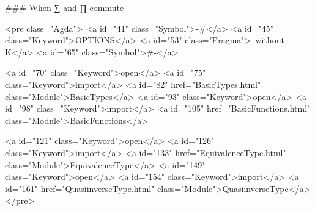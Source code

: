 
### When ∑ and ∏ commute

<pre class="Agda">
<a id="41" class="Symbol">{-#</a> <a id="45" class="Keyword">OPTIONS</a> <a id="53" class="Pragma">--without-K</a> <a id="65" class="Symbol">#-}</a>

<a id="70" class="Keyword">open</a> <a id="75" class="Keyword">import</a> <a id="82" href="BasicTypes.html" class="Module">BasicTypes</a>
<a id="93" class="Keyword">open</a> <a id="98" class="Keyword">import</a> <a id="105" href="BasicFunctions.html" class="Module">BasicFunctions</a>

<a id="121" class="Keyword">open</a> <a id="126" class="Keyword">import</a> <a id="133" href="EquivalenceType.html" class="Module">EquivalenceType</a>
<a id="149" class="Keyword">open</a> <a id="154" class="Keyword">import</a> <a id="161" href="QuasiinverseType.html" class="Module">QuasiinverseType</a>
</pre>

